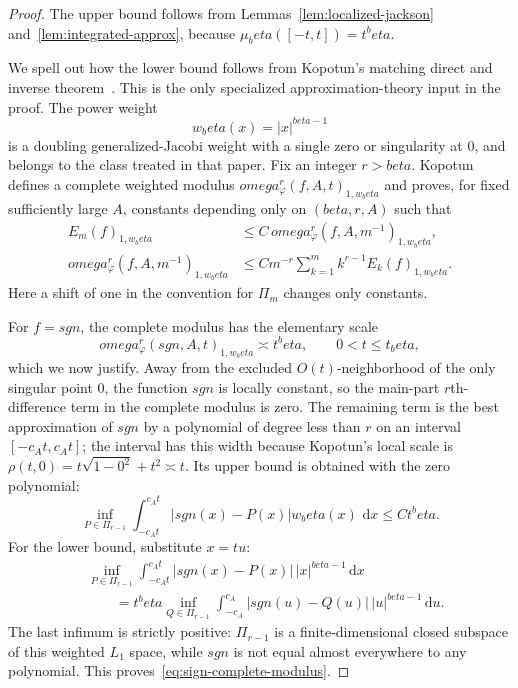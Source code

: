 \documentclass[11pt]{article}
\def\beta{beta}%
\def\omega{omega}%
\def\sgn{sgn}%
\newcommand{\sgn}{\operatorname{sgn}}
\newcommand{\dd}{\,\mathrm d}
\begin{document}
\begin{proof}
The upper bound follows from Lemmas~\ref{lem:localized-jackson} and~\ref{lem:integrated-approx}, because
$\mu_\beta([-t,t])=t^\beta$.

We spell out how the lower bound follows from Kopotun's matching direct and inverse theorem~\cite[Theorems~5.2 and~9.1, Corollary~11.1]{Kopotun}.  This is the only specialized approximation-theory input in the proof.  The power weight
\[
w_\beta(x)=|x|^{\beta-1}
\]
is a doubling generalized-Jacobi weight with a single zero or singularity at $0$, and belongs to the class treated in that paper.  Fix an integer $r>\beta$.  Kopotun defines a complete weighted modulus
$\omega_{\varphi}^{r}(f,A,t)_{1,w_\beta}$ and proves, for fixed sufficiently large $A$, constants depending only on $(\beta,r,A)$ such that
\begin{align}
E_m(f)_{1,w_\beta}
&\le C\,\omega_{\varphi}^{r}(f,A,m^{-1})_{1,w_\beta},
\label{eq:kopotun-direct}\\
\omega_{\varphi}^{r}(f,A,m^{-1})_{1,w_\beta}
&\le
C m^{-r}\sum_{k=1}^{m}k^{r-1}E_k(f)_{1,w_\beta}.
\label{eq:kopotun-inverse}
\end{align}
Here a shift of one in the convention for $\Pi_m$ changes only constants.

For $f=\sgn$, the complete modulus has the elementary scale
\begin{equation}
\label{eq:sign-complete-modulus}
\omega_{\varphi}^{r}(\sgn,A,t)_{1,w_\beta}
\asymp t^\beta,
\qquad 0<t\le t_\beta,
\end{equation}
which we now justify.  Away from the excluded $O(t)$-neighborhood of the only singular point $0$, the function $\sgn$ is locally constant, so the main-part $r$th-difference term in the complete modulus is zero.  The remaining term is the best approximation of $\sgn$ by a polynomial of degree less than $r$ on an interval $[-c_At,c_At]$; the interval has this width because Kopotun's local scale is
$\rho(t,0)=t\sqrt{1-0^2}+t^2\asymp t$.  Its upper bound is obtained with the zero polynomial:
\[
\inf_{P\in\Pi_{r-1}}
\int_{-c_At}^{c_At}|\sgn(x)-P(x)|w_\beta(x)\,\dd x
\le C t^\beta.
\]
For the lower bound, substitute $x=tu$:
\begin{align*}
&\inf_{P\in\Pi_{r-1}}
\int_{-c_At}^{c_At}|\sgn(x)-P(x)|\,|x|^{\beta-1}\dd x\\
&\qquad=
 t^\beta
\inf_{Q\in\Pi_{r-1}}
\int_{-c_A}^{c_A}|\sgn(u)-Q(u)|\,|u|^{\beta-1}\dd u.
\end{align*}
The last infimum is strictly positive: $\Pi_{r-1}$ is a finite-dimensional closed subspace of this weighted $L_1$ space, while $\sgn$ is not equal almost everywhere to any polynomial.  This proves~\eqref{eq:sign-complete-modulus}.


\end{proof}
\end{document}
